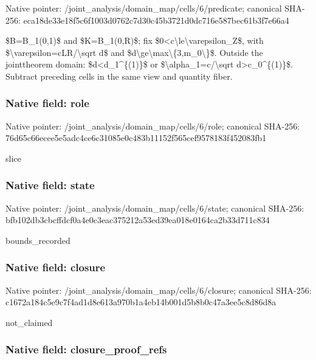 \documentclass[10pt,a4paper]{article}
\begin{document}
Native pointer: /joint\_analysis/domain\_m\allowbreak{}ap/cells/6/predicate; canonical SHA-256: eca18de33e18f5c6f1003d07\allowbreak{}62c7d30c45b3721d0dc716e5\allowbreak{}87bec61b3f7e66a4


\$B=B\_1(0,1)\$ and \$K=B\_1(0,R)\$; fix \$0<c\textbackslash{}le\textbackslash{}varepsilon\_Z\$, with \$\textbackslash{}varepsilon=cLR/\textbackslash{}sqrt d\$ and \$d\textbackslash{}ge\textbackslash{}max\textbackslash{}\{3,m\_0\textbackslash{}\}\$. Outside the jointtheorem domain: \$d<d\_1\textasciicircum{}\{(1)\}\$ or \$\textbackslash{}alpha\_1=c/\textbackslash{}sqrt d>c\_0\textasciicircum{}\{(1)\}\$. Subtract preceding cells in the same view and quantity fiber.


\subsubsection{Native field: role}


Native pointer: /joint\_analysis/domain\_map/cells/6/role; canonical SHA-256: 76d65c66ecee5e5adc4ce6c3\allowbreak{}1085e0c483b11152f565cef9\allowbreak{}578183f452083fb1


slice


\subsubsection{Native field: state}


Native pointer: /joint\_analysis/domain\_m\allowbreak{}ap/cells/6/state; canonical SHA-256: bfb102db3cbcffdcf0a4e0c3\allowbreak{}eac375212a53ed39ea018e01\allowbreak{}64ca2b33d711c834


bounds\_recorded


\subsubsection{Native field: closure}


Native pointer: /joint\_analysis/domain\_m\allowbreak{}ap/cells/6/closure; canonical SHA-256: c1672a184c5e9c7f4ad1d8e6\allowbreak{}13a970b1a4eb14b001d5b8b0\allowbreak{}c47a3ee5c8d86d8a


not\_claimed


\subsubsection{Native field: closure\_proof\_refs}
\end{document}
